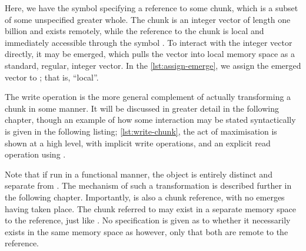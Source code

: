 
Here, we have the symbol  specifying a reference to some
chunk, which is a subset of some unspecified greater whole. The chunk is
an integer vector of length one billion and exists remotely, while the
reference to the chunk is local and immediately accessible through the
symbol . To interact with the integer vector directly, it may
be emerged, which pulls the vector into local memory space as a
standard, regular, integer vector. In the \cref{lst:assign-emerge}, we assign
the emerged vector to ; that is, ``local''.


The write operation is the more general complement of actually
transforming a chunk in some manner. It will be discussed in greater
detail in the following chapter, though an example of how some
interaction may be stated syntactically is given in the following
listing; \cref{lst:write-chunk}, the act of maximisation is shown at a high level, with
implicit write operations, and an explicit read operation using
.


Note that if run in a functional manner, the object  is
entirely distinct and separate from . The mechanism of such a
transformation is described further in the following chapter.
Importantly,  is also a chunk reference, with no emerges
having taken place. The chunk referred to may exist in a separate memory
space to the reference, just like . No specification is given
as to whether it necessarily exists in the same memory space as
 however, only that both are remote to the reference.


